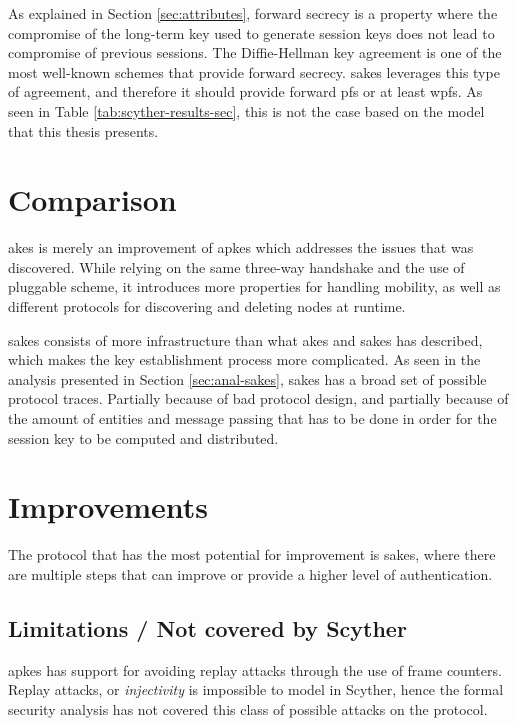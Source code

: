 As explained in Section \ref{sec:attributes}, forward secrecy is a property where the compromise of the long-term key used to generate session keys does not lead to compromise of previous sessions. The Diffie-Hellman key agreement is one of the most well-known schemes that provide forward secrecy. \gls{sakes} leverages this type of agreement, and therefore it should provide forward \gls{pfs} or at least \gls{wpfs}. As seen in Table \ref{tab:scyther-results-sec}, this is not the case based on the model that this thesis presents.  


\section{Comparison}


\gls{akes} is merely an improvement of \gls{apkes} which addresses the issues that was discovered. While relying on the same three-way handshake and the use of pluggable scheme, it introduces more properties for handling mobility, as well as different protocols for discovering and deleting nodes at runtime.


\gls{sakes} consists of more infrastructure than what \gls{akes} and \gls{sakes} has described, which makes the key establishment process more complicated. As seen in the analysis presented in Section \ref{sec:anal-sakes}, \gls{sakes} has a broad set of possible protocol traces. Partially because of bad protocol design, and partially because of the amount of entities and message passing that has to be done in order for the session key to be computed and distributed.  

\section{Improvements}

The protocol that has the most potential for improvement is \gls{sakes}, where there are multiple steps that can improve or provide a higher level of authentication.









\subsection{Limitations / Not covered by Scyther}


\gls{apkes} has support for avoiding replay attacks through the use of frame counters. Replay attacks, or \emph{injectivity} is impossible to model in Scyther, hence the formal security analysis has not covered this class of possible attacks on the protocol. 

